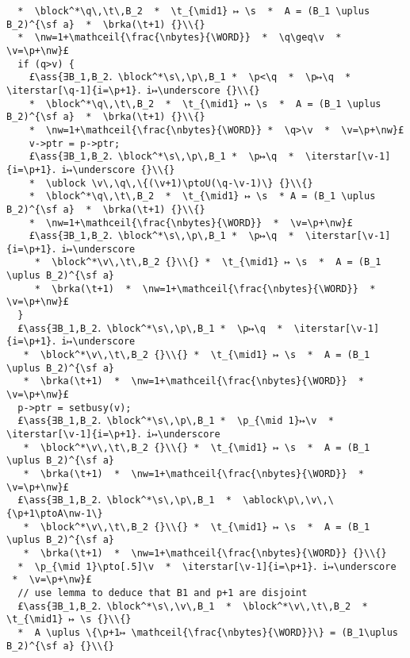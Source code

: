 \documentclass[12pt,a4paper]{article}
\makeatletter
\newcommand{\ml}[2][t]{\mbox{\mdseries\begin{tabular}[#1]{@{}L@{}}#2\end{tabular}}}
\newcommand{\ass}[1]{\ensuremath{{\color{blue}\left\{\ml[c]{#1}\right\}}}}
\newcommand{\iterstar}[2][]{\text{\LARGE $*$}^{#1}_{#2}}
\newcommand{\block}{\mathop{\emph{block}}}
\newcommand{\ublock}{\mathop{\emph{ublock}}}
\newcommand{\ablock}{\mathop{\emph{ablock}}}
\newcommand{\s}{{\tt s}}
\renewcommand{\t}{{\tt t}}
\newcommand{\p}{{\tt p}}
\newcommand{\q}{{\tt q}}
\renewcommand{\v}{{\tt v}}
\newcommand{\brka}{\mathop{\emph{brka}}}
\newcommand{\nw}{{\tt nw}}
\newcommand{\nbytes}{{\tt nbytes}}
\newcommand{\WORD}{{\tt WORD}}
\newcommand{\mathceil}[1]{\left\lceil#1\right\rceil}
\newcommand{\ptoU}{\mathbin{↦_{\sf u}}}
\newcommand{\ptoA}{\mathbin{↦_{\sf a}}}
\makeatother
\begin{document}
\begin{lstlisting}
  *  \block^*\q\,\t\,B_2  *  \t_{\mid1} ↦ \s  *  A = (B_1 \uplus B_2)^{\sf a}  *  \brka(\t+1) {}\\{}
  *  \nw=1+\mathceil{\frac{\nbytes}{\WORD}}  *  \q\geq\v  *  \v=\p+\nw}£ 
  if (q>v) {
    £\ass{∃B_1,B_2．\block^*\s\,\p\,B_1 *  \p<\q  *  \p↦\q  *  \iterstar[\q-1]{i=\p+1}．i↦\underscore {}\\{}
    *  \block^*\q\,\t\,B_2  *  \t_{\mid1} ↦ \s  *  A = (B_1 \uplus B_2)^{\sf a}  *  \brka(\t+1) {}\\{}
    *  \nw=1+\mathceil{\frac{\nbytes}{\WORD}} *  \q>\v  *  \v=\p+\nw}£ 
    v->ptr = p->ptr;
    £\ass{∃B_1,B_2．\block^*\s\,\p\,B_1 *  \p↦\q  *  \iterstar[\v-1]{i=\p+1}．i↦\underscore {}\\{}
    *  \ublock \v\,\q\,\{(\v+1)\ptoU(\q-\v-1)\} {}\\{} 
    *  \block^*\q\,\t\,B_2  *  \t_{\mid1} ↦ \s  * A = (B_1 \uplus B_2)^{\sf a}  *  \brka(\t+1) {}\\{}
    *  \nw=1+\mathceil{\frac{\nbytes}{\WORD}}  *  \v=\p+\nw}£ 
    £\ass{∃B_1,B_2．\block^*\s\,\p\,B_1 *  \p↦\q  *  \iterstar[\v-1]{i=\p+1}．i↦\underscore 
     *  \block^*\v\,\t\,B_2 {}\\{} *  \t_{\mid1} ↦ \s  *  A = (B_1 \uplus B_2)^{\sf a} 
     *  \brka(\t+1)  *  \nw=1+\mathceil{\frac{\nbytes}{\WORD}}  *  \v=\p+\nw}£ 
  }
  £\ass{∃B_1,B_2．\block^*\s\,\p\,B_1 *  \p↦\q  *  \iterstar[\v-1]{i=\p+1}．i↦\underscore 
   *  \block^*\v\,\t\,B_2 {}\\{} *  \t_{\mid1} ↦ \s  *  A = (B_1 \uplus B_2)^{\sf a}
   *  \brka(\t+1)  *  \nw=1+\mathceil{\frac{\nbytes}{\WORD}}  *  \v=\p+\nw}£
  p->ptr = setbusy(v);
  £\ass{∃B_1,B_2．\block^*\s\,\p\,B_1 *  \p_{\mid 1}↦\v  *  \iterstar[\v-1]{i=\p+1}．i↦\underscore 
   *  \block^*\v\,\t\,B_2 {}\\{} *  \t_{\mid1} ↦ \s  *  A = (B_1 \uplus B_2)^{\sf a}
   *  \brka(\t+1)  *  \nw=1+\mathceil{\frac{\nbytes}{\WORD}}  *  \v=\p+\nw}£
  £\ass{∃B_1,B_2．\block^*\s\,\p\,B_1  *  \ablock\p\,\v\,\{\p+1\ptoA\nw-1\} 
   *  \block^*\v\,\t\,B_2 {}\\{} *  \t_{\mid1} ↦ \s  *  A = (B_1 \uplus B_2)^{\sf a} 
   *  \brka(\t+1)  *  \nw=1+\mathceil{\frac{\nbytes}{\WORD}} {}\\{}
  *  \p_{\mid 1}\pto[.5]\v  *  \iterstar[\v-1]{i=\p+1}．i↦\underscore   *  \v=\p+\nw}£
  // use lemma to deduce that B1 and p+1 are disjoint
  £\ass{∃B_1,B_2．\block^*\s\,\v\,B_1  *  \block^*\v\,\t\,B_2  *  \t_{\mid1} ↦ \s {}\\{}
  *  A \uplus \{\p+1↦ \mathceil{\frac{\nbytes}{\WORD}}\} = (B_1\uplus B_2)^{\sf a} {}\\{}

\end{lstlisting}
\end{document}
